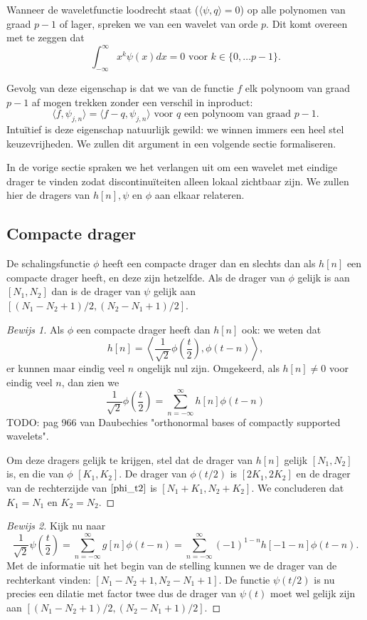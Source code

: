 \documentclass[11pt]{amsart}
\begin{document}
Wanneer de waveletfunctie loodrecht staat ($\langle \psi, q\rangle = 0$) op alle polynomen van graad $p-1$ of lager, spreken we van een wavelet van orde $p$. Dit komt overeen met te zeggen dat
\[
	\int_{-\infty}^\infty x^k \psi(x) dx = 0 \text{ voor } k \in \{ 0, \ldots p-1 \}.
\]

Gevolg van deze eigenschap is dat we van de functie $f$ elk polynoom van graad $p-1$ af mogen trekken zonder een verschil in inproduct:
\[
	\langle f, \psi_{j,n} \rangle = \langle f - q, \psi_{j,n} \rangle \text{ voor $q$ een polynoom van graad $p-1$}. 
\]
Intu\"itief is deze eigenschap natuurlijk gewild: we winnen immers een heel stel keuzevrijheden. We zullen dit argument in een volgende sectie formaliseren.

In de vorige sectie spraken we het verlangen uit om een wavelet met eindige drager te vinden zodat discontinu\"iteiten alleen lokaal zichtbaar zijn. We zullen hier de dragers van $h[n], \psi$ en $\phi$ aan elkaar relateren.


\subsection{Compacte drager} De schalingsfunctie $\phi$ heeft een compacte drager dan en slechts dan als $h[n]$ een compacte drager heeft, en deze zijn hetzelfde. Als de drager van $\phi$ gelijk is aan $[N_1,N_2]$ dan is de drager van $\psi$ gelijk aan $[(N_1 - N_2 + 1)/2, (N_2 - N_1 + 1)/2]$.
\begin{proof}[Bewijs 1] Als $\phi$ een compacte drager heeft dan $h[n]$ ook: we weten dat
\[
	h[n] = \left\langle \frac{1}{\sqrt{2}} \phi\left(\frac{t}{2}\right), \phi(t-n) \right\rangle,
\]
er kunnen maar eindig veel $n$ ongelijk nul zijn. Omgekeerd, als $h[n] \not= 0$ voor eindig veel $n$, dan zien we
\begin{equation}
\label{phi_t2}
	\frac{1}{\sqrt{2}} \phi\left(\frac{t}{2}\right) = \sum_{n=-\infty}^\infty h[n] \phi(t-n)
\end{equation}
 TODO: pag 966 van Daubechies "orthonormal bases of compactly supported wavelets".

Om deze dragers gelijk te krijgen, stel dat de drager van $h[n]$ gelijk $[N_1,N_2]$ is, en die van $\phi$ $[K_1, K_2]$. De drager van $\phi(t/2)$ is $[2K_1, 2K_2]$ en de drager van de rechterzijde van $\ref{phi_t2}$ is $[N_1 + K_1, N_2 + K_2]$. We concluderen dat $K_1 = N_1$ en $K_2 = N_2$.
\end{proof}
\begin{proof}[Bewijs 2]
Kijk nu naar
\[
\frac{1}{\sqrt{2}} \psi\left(\frac{t}{2}\right) = \sum_{n=-\infty}^{\infty} g[n] \phi(t-n) = \sum_{n=-\infty}^{\infty} (-1)^{1-n}h[-1-n] \phi(t-n).
\]
Met de informatie uit het begin van de stelling kunnen we de drager van de rechterkant vinden: $[N_1 - N_2 + 1, N_2 - N_1 + 1]$. De functie $\psi(t/2)$ is nu precies een dilatie met factor twee dus de drager van $\psi(t)$ moet wel gelijk zijn aan $[(N_1 - N_2 + 1)/2, (N_2 - N_1 + 1)/2]$.
\end{proof}
\end{document}
